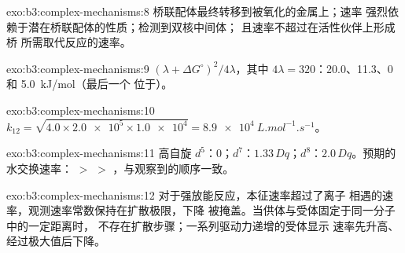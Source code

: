 \begin{solution}{exo:b3:complex-mechanisms:8}
桥联配体最终转移到被氧化的金属上；速率
强烈依赖于潜在桥联配体的性质；检测到双核中间体；
且速率不超过在活性伙伴上形成桥
所需取代反应的速率。
\end{solution}

\begin{solution}{exo:b3:complex-mechanisms:9}
$(\lambda + \Delta G^\circ)^2/4\lambda$，其中 $4\lambda = 320$：20.0、11.3、0 和 \qty{5.0}{kJ/mol}（最后一个
位于）。
\end{solution}

\begin{solution}{exo:b3:complex-mechanisms:10}
$k_{12} = \sqrt{4.0 \times \num{2.0e5} \times \num{1.0e4}} = \qty{8.9e4}{L.mol^{-1}.s^{-1}}$。
\end{solution}

\begin{solution}{exo:b3:complex-mechanisms:11}
高自旋 $d^5$：0；$d^7$：$1.33\,Dq$；$d^8$：$2.0\,Dq$。预期的水交换速率： $>$  $>$
，与观察到的顺序一致。
\end{solution}

\begin{solution}{exo:b3:complex-mechanisms:12}
对于强放能反应，本征速率超过了离子
相遇的速率，观测速率常数保持在扩散极限，下降
被掩盖。当供体与受体固定于同一分子中的一定距离时，
不存在扩散步骤；一系列驱动力递增的受体显示
速率先升高、经过极大值后下降。
\end{solution}


